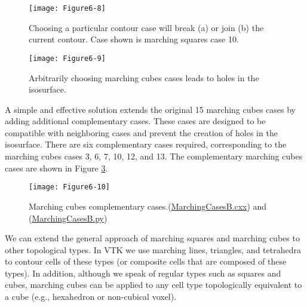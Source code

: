 \begin{figure}[!htb]
	\centering
	\texttt{[image: Figure6-8]}\\
	\caption{Choosing a particular contour case will break (a) or join (b) the current contour. Case shown is marching squares case 10.}
	\label{fig:Figure6-8}
\end{figure}

\begin{figure}[!htb]
	\centering
	\texttt{[image: Figure6-9]}\\
	\caption{Arbitrarily choosing marching cubes cases leads to holes in the isosurface.}
	\label{fig:Figure6-9}
\end{figure}

A simple and effective solution extends the original 15 marching cubes cases by adding additional complementary cases. These cases are designed to be compatible with neighboring cases and prevent the creation of holes in the isosurface. There are six complementary cases required, corresponding to the marching cubes cases 3, 6, 7, 10, 12, and 13. The complementary marching cubes cases are shown in Figure \ref{fig:Figure6-10}.

\begin{figure}[!htb]
	\centering
	\texttt{[image: Figure6-10]}\\
	\caption{Marching cubes complementary cases.(\href{https://lorensen.github.io/VTKExamples/site/Cxx/VisualizationAlgorithms/MarchingCasesB/}{MarchingCasesB.cxx}) and (\href{https://lorensen.github.io/VTKExamples/site/Python/VisualizationAlgorithms/MarchingCasesB/}{MarchingCasesB.py})}
	\label{fig:Figure6-10}
\end{figure}

We can extend the general approach of marching squares and marching cubes to other topological types. In VTK we use marching lines, triangles, and tetrahedra to contour cells of these types (or composite cells that are composed of these types). In addition, although we speak of regular types such as squares and cubes, marching cubes can be applied to any cell type topologically equivalent to a cube (e.g., hexahedron or non-cubical voxel).

